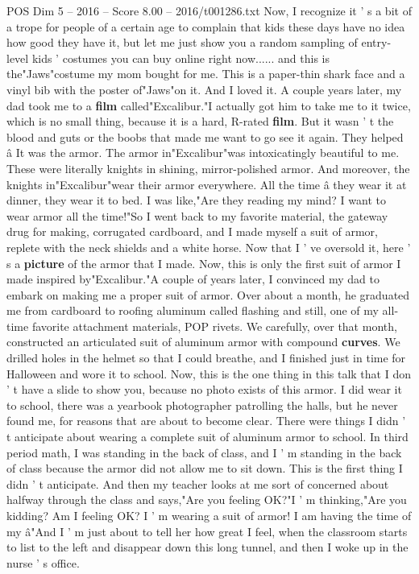 \begin{textsample}{POS Dim 5 – 2016 – Score 8.00 – 2016/t001286.txt}
Now, I recognize it ' s a bit of a trope for people of a certain age to complain that kids these days have no idea how good they have it, but let me just show you a random sampling of entry-level kids ' costumes you can buy online right now...... and this is the"Jaws"costume my mom bought for me.
This is a paper-thin shark face and a vinyl bib with the poster of"Jaws"on it.
And I loved it.
A couple years later, my dad took me to a \textbf{film} called"Excalibur."I actually got him to take me to it twice, which is no small thing, because it is a hard, R-rated \textbf{film}.
But it wasn ' t the blood and guts or the boobs that made me want to go see it again.
They helped â It was the armor.
The armor in"Excalibur"was intoxicatingly beautiful to me.
These were literally knights in shining, mirror-polished armor.
And moreover, the knights in"Excalibur"wear their armor everywhere.
All the time â they wear it at dinner, they wear it to bed.
I was like,"Are they reading my mind?
I want to wear armor all the time!"So I went back to my favorite material, the gateway drug for making, corrugated cardboard, and I made myself a suit of armor, replete with the neck shields and a white horse.
Now that I ' ve oversold it, here ' s a \textbf{picture} of the armor that I made.
Now, this is only the first suit of armor I made inspired by"Excalibur."A couple of years later, I convinced my dad to embark on making me a proper suit of armor.
Over about a month, he graduated me from cardboard to roofing aluminum called flashing and still, one of my all-time favorite attachment materials, POP rivets.
We carefully, over that month, constructed an articulated suit of aluminum armor with compound \textbf{curves}.
We drilled holes in the helmet so that I could breathe, and I finished just in time for Halloween and wore it to school.
Now, this is the one thing in this talk that I don ' t have a slide to show you, because no photo exists of this armor.
I did wear it to school, there was a yearbook photographer patrolling the halls, but he never found me, for reasons that are about to become clear.
There were things I didn ' t anticipate about wearing a complete suit of aluminum armor to school.
In third period math, I was standing in the back of class, and I ' m standing in the back of class because the armor did not allow me to sit down.
This is the first thing I didn ' t anticipate.
And then my teacher looks at me sort of concerned about halfway through the class and says,"Are you feeling OK?"I ' m thinking,"Are you kidding?
Am I feeling OK?
I ' m wearing a suit of armor!
I am having the time of my â"And I ' m just about to tell her how great I feel, when the classroom starts to list to the left and disappear down this long tunnel, and then I woke up in the nurse ' s office.

\end{textsample}
